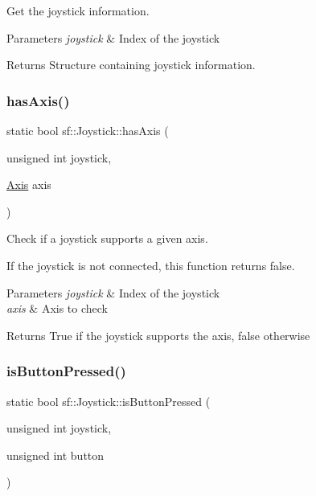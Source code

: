 Get the joystick information. 


\begin{DoxyParams}{Parameters}
{\em joystick} & Index of the joystick\\
\hline
\end{DoxyParams}
\begin{DoxyReturn}{Returns}
Structure containing joystick information. 
\end{DoxyReturn}
\mbox{\label{classsf_1_1_joystick_a268e8f2a11ae6af4a47c727cb4ab4d95}} 
\subsubsection{\texorpdfstring{has\+Axis()}{hasAxis()}}
{\footnotesize\ttfamily static bool sf\+::\+Joystick\+::has\+Axis (\begin{DoxyParamCaption}\item[{unsigned int}]{joystick,  }\item[{\hyperlink{classsf_1_1_joystick_a48db337092c2e263774f94de6d50baa7}{Axis}}]{axis }\end{DoxyParamCaption})\hspace{0.3cm}{\ttfamily [static]}}



Check if a joystick supports a given axis. 

If the joystick is not connected, this function returns false.


\begin{DoxyParams}{Parameters}
{\em joystick} & Index of the joystick \\
\hline
{\em axis} & Axis to check\\
\hline
\end{DoxyParams}
\begin{DoxyReturn}{Returns}
True if the joystick supports the axis, false otherwise 
\end{DoxyReturn}
\mbox{\label{classsf_1_1_joystick_ae0d97a4b84268cbe6a7078e1b2717835}} 
\subsubsection{\texorpdfstring{is\+Button\+Pressed()}{isButtonPressed()}}
{\footnotesize\ttfamily static bool sf\+::\+Joystick\+::is\+Button\+Pressed (\begin{DoxyParamCaption}\item[{unsigned int}]{joystick,  }\item[{unsigned int}]{button }\end{DoxyParamCaption})\hspace{0.3cm}{\ttfamily [static]}}



